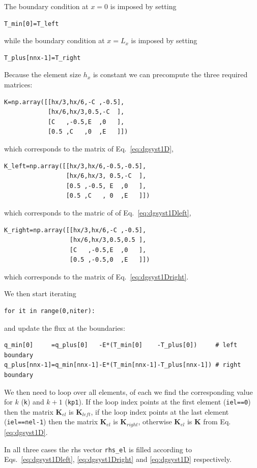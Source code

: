 The boundary condition at $x=0$ is imposed by setting
\begin{lstlisting}
T_min[0]=T_left
\end{lstlisting}
while the boundary condition at $x=L_x$ is imposed by setting
\begin{lstlisting}
T_plus[nnx-1]=T_right
\end{lstlisting}

Because the element size $h_x$ is constant we can precompute the three required matrices:
\begin{lstlisting}
K=np.array([[hx/3,hx/6,-C ,-0.5],
            [hx/6,hx/3,0.5,-C  ],
            [C   ,-0.5,E  ,0   ],
            [0.5 ,C   ,0  ,E   ]])
\end{lstlisting}
which corresponds to the matrix of Eq.~\eqref{eq:dgsyst1D},
\begin{lstlisting}
K_left=np.array([[hx/3,hx/6,-0.5,-0.5],
                 [hx/6,hx/3, 0.5,-C  ],
                 [0.5 ,-0.5, E  ,0   ],
                 [0.5 ,C   , 0  ,E   ]])
\end{lstlisting}
which corresponds to the matric of of Eq.~\eqref{eq:dgsyst1Dleft},
\begin{lstlisting}
K_right=np.array([[hx/3,hx/6,-C ,-0.5],
                  [hx/6,hx/3,0.5,0.5 ],
                  [C   ,-0.5,E  ,0   ],
                  [0.5 ,-0.5,0  ,E   ]])
\end{lstlisting}
which corresponds to the matrix of Eq.~\eqref{eq:dgsyst1Dright}.
 
We then start iterating
\begin{lstlisting}
for it in range(0,niter):
\end{lstlisting}
and update the flux at the boundaries:
\begin{lstlisting}
q_min[0]     =q_plus[0]   -E*(T_min[0]    -T_plus[0])     # left boundary
q_plus[nnx-1]=q_min[nnx-1]-E*(T_min[nnx-1]-T_plus[nnx-1]) # right boundary
\end{lstlisting}
We then need to loop over all elements, of each we find the corresponding
value for $k$ ({\tt k}) and $k+1$ ({\tt kp1}).
If the loop index points at the first element ({\tt iel==0})
then the matrix ${\bm K}_{el}$ is ${\bm K}_{left}$, 
if the loop index points at the last element ({\tt iel==nel-1})
then the matrix ${\bm K}_{el}$ is ${\bm K}_{right}$, 
otherwise ${\bm K}_{el}$ is ${\bm K}$ from Eq.\eqref{eq:dgsyst1D}.

In all three cases the rhs vector {\tt rhs\_el} is filled according to 
Eqs.~\eqref{eq:dgsyst1Dleft}, \eqref{eq:dgsyst1Dright} and \eqref{eq:dgsyst1D} respectively.

